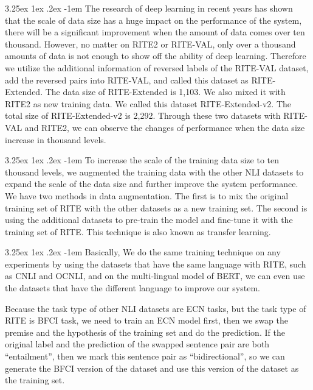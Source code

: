 \documentclass[12pt]{article}
\makeatletter
\renewcommand\paragraph{\@startsection{paragraph}{5}{\z@}%
  {3.25ex \@plus1ex \@minus.2ex}%
  {-1em}%
  {\normalfont\normalsize\bfseries}}
\makeatother
\begin{document}
\begin{CJK*}{UTF8}{bkai}
\begin{spacing}{1.77}
\paragraph{}
The research of deep learning in recent years has shown that the scale of data size has a huge impact on the performance of the system, there will be a significant improvement when the amount of data comes over ten thousand. However, no matter on RITE2 or RITE-VAL, only over a thousand amounts of data is not enough to show off the ability of deep learning. Therefore we utilize the additional information of reversed labels of the RITE-VAL dataset, add the reversed pairs into RITE-VAL, and called this dataset as RITE-Extended. The data size of RITE-Extended is 1,103. We also mixed it with RITE2 as new training data. We called this dataset RITE-Extended-v2. The total size of RITE-Extended-v2 is 2,292. Through these two datasets with RITE-VAL and RITE2, we can observe the changes of performance when the data size increase in thousand levels.

\paragraph{}
To increase the scale of the training data size to ten thousand levels, we augmented the training data with the other NLI datasets to expand the scale of the data size and further improve the system performance. We have two methods in data augmentation. The first is to mix the original training set of RITE with the other datasets as a new training set. The second is using the additional datasets to pre-train the model and fine-tune it with the training set of RITE. This technique is also known as transfer learning.

\paragraph{}
Basically, We do the same training technique on any experiments by using the datasets that have the same language with RITE, such as CNLI and OCNLI, and on the multi-lingual model of BERT, we can even use the datasets that have the different language to improve our system.

Because the task type of other NLI datasets are ECN tasks, but the task type of RITE is BFCI task, we need to train an ECN model first, then we swap the premise and the hypothesis of the training set and do the prediction. If the original label and the prediction of the swapped sentence pair are both ``entailment'', then we mark this sentence pair as ``bidirectional'', so we can generate the BFCI version of the dataset and use this version of the dataset as the training set.


\end{spacing}
\end{CJK*}
\end{document}
